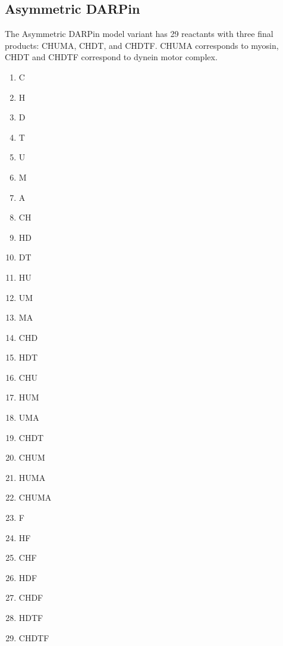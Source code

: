 \subsection{Asymmetric DARPin}

The Asymmetric DARPin model variant has 29 reactants with three final products: CHUMA, CHDT, and CHDTF. CHUMA corresponds to myosin, CHDT and CHDTF correspond to dynein motor complex.

\begin{multicols}{4}
\begin{enumerate}

\item C             %
\item H           %
\item D           %
\item T          %
\item U         %
\item M             %
\item A             %

\item CH         %
\item HD         %
\item DT    %
\item HU               %
\item UM              %
\item MA  %

\item CHD            %
\item HDT            %
\item CHU                  %
\item HUM               %
\item UMA     %

\item CHDT      %
\item CHUM                %
\item HUMA   %

\item CHUMA %

\item F                         %
\item HF             %
\item CHF        %
\item HDF         %
\item CHDF         %
\item HDTF          %
\item CHDTF        %

\end{enumerate}
\end{multicols}

